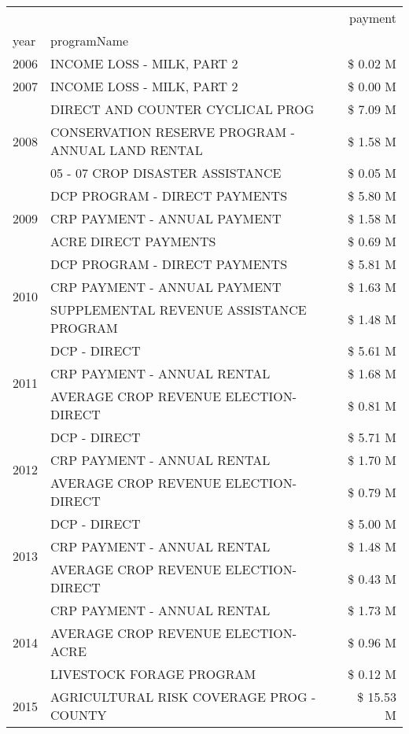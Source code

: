 \begin{tabular}{llr}
\toprule
 &  & payment \\
year & programName &  \\
\midrule
2006 & INCOME LOSS - MILK, PART 2 & \$ 0.02 M \\
\cline{1-3}
2007 & INCOME LOSS - MILK, PART 2 & \$ 0.00 M \\
\cline{1-3}
\multirow[t]{3}{*}{2008} & DIRECT AND COUNTER CYCLICAL PROG & \$ 7.09 M \\
 & CONSERVATION RESERVE PROGRAM - ANNUAL LAND RENTAL & \$ 1.58 M \\
 & 05 - 07 CROP DISASTER ASSISTANCE & \$ 0.05 M \\
\cline{1-3}
\multirow[t]{3}{*}{2009} & DCP PROGRAM - DIRECT PAYMENTS & \$ 5.80 M \\
 & CRP PAYMENT - ANNUAL PAYMENT & \$ 1.58 M \\
 & ACRE DIRECT PAYMENTS & \$ 0.69 M \\
\cline{1-3}
\multirow[t]{3}{*}{2010} & DCP PROGRAM - DIRECT PAYMENTS & \$ 5.81 M \\
 & CRP PAYMENT - ANNUAL PAYMENT & \$ 1.63 M \\
 & SUPPLEMENTAL REVENUE ASSISTANCE PROGRAM & \$ 1.48 M \\
\cline{1-3}
\multirow[t]{3}{*}{2011} & DCP - DIRECT & \$ 5.61 M \\
 & CRP PAYMENT - ANNUAL RENTAL & \$ 1.68 M \\
 & AVERAGE CROP REVENUE ELECTION-DIRECT & \$ 0.81 M \\
\cline{1-3}
\multirow[t]{3}{*}{2012} & DCP - DIRECT & \$ 5.71 M \\
 & CRP PAYMENT - ANNUAL RENTAL & \$ 1.70 M \\
 & AVERAGE CROP REVENUE ELECTION-DIRECT & \$ 0.79 M \\
\cline{1-3}
\multirow[t]{3}{*}{2013} & DCP - DIRECT & \$ 5.00 M \\
 & CRP PAYMENT - ANNUAL RENTAL & \$ 1.48 M \\
 & AVERAGE CROP REVENUE ELECTION-DIRECT & \$ 0.43 M \\
\cline{1-3}
\multirow[t]{3}{*}{2014} & CRP PAYMENT - ANNUAL RENTAL & \$ 1.73 M \\
 & AVERAGE CROP REVENUE ELECTION-ACRE & \$ 0.96 M \\
 & LIVESTOCK FORAGE PROGRAM & \$ 0.12 M \\
\cline{1-3}
\multirow[t]{3}{*}{2015} & AGRICULTURAL RISK COVERAGE PROG - COUNTY & \$ 15.53 M \\

\end{tabular}

